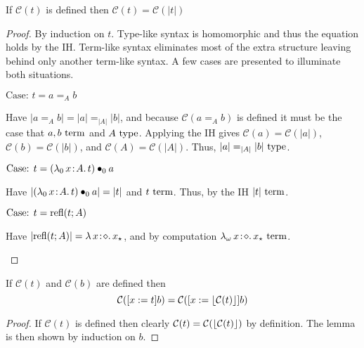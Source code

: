 \begin{lemma}
    \label{lem:2:classify_erase}
    If $\mathcal{C}(t)$ is defined then $\mathcal{C}(t) = \mathcal{C}(|t|)$
\end{lemma}
\begin{proof}
    By induction on $t$.
    Type-like syntax is homomorphic and thus the equation holds by the IH.
    Term-like syntax eliminates most of the extra structure leaving behind only another term-like syntax.
    A few cases are presented to illuminate both situations.

    $\text{Case: }t = a =_A b$
    \begin{proofcase}
        Have $|a =_A b| = |a| =_{|A|} |b|$, and because $\mathcal{C}(a =_A b)$ is defined it must be the case that $a, b~\textnormal{term}$ and $A~\textnormal{type}$.
        Applying the IH gives $\mathcal{C}(a) = \mathcal{C}(|a|)$, $\mathcal{C}(b) = \mathcal{C}(|b|)$, and $\mathcal{C}(A) = \mathcal{C}(|A|)$.
        Thus, $|a| =_{|A|} |b|~\textnormal{type}$.
    \end{proofcase}

    $\text{Case: }t = ({\lambda_0}\, x\! : \! A.\, t) \bullet_{0} a$
    \begin{proofcase}
        Have $|({\lambda_0}\, x\! : \! A.\, t) \bullet_{0} a| = |t|$ and $t~\textnormal{term}$.
        Thus, by the IH $|t|~\textnormal{term}$.
    \end{proofcase}
    
    $\text{Case: }t = \textnormal{refl}(t; A)$
    \begin{proofcase}
        Have $|\textnormal{refl}(t; A)| = {\lambda}\, x\! : \! \diamond.\, x_\star$, and by computation ${\lambda_\omega}\, x\! : \! \diamond.\, x_\star~\textnormal{term}$.
    \end{proofcase}
\end{proof}

\begin{lemma}
    \label{lem:2:classify_subst}
    If $\mathcal{C}(t)$ and $\mathcal{C}(b)$ are defined then $$\mathcal{C}([x := t]b) = \mathcal{C}([x := \lfloor \mathcal{C}(t) \rfloor]b)$$
\end{lemma}
\begin{proof}
    If $\mathcal{C}(t)$ is defined then clearly $\mathcal{C}(t) = \mathcal{C}(\lfloor \mathcal{C}(t) \rfloor)$ by definition.
    The lemma is then shown by induction on $b$.
\end{proof}

